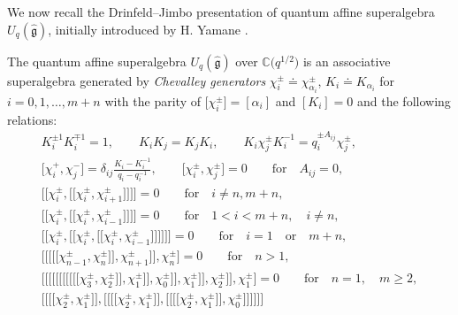 \documentclass[pdftex]{sigma}
\numberwithin{equation}{section}
\begin{document}
We now recall the Drinfeld--Jimbo presentation of quantum affine superalgebra
$U_q(\mathfrak{\hat{g}})$, initially introduced by H. Yamane \cite{HYAM}.
\begin{Definition}
The quantum affine superalgebra $U_q(\mathfrak{\hat{g}})$ over $\mathbb{C}\bigl(q^{1/2}\bigr)$ is an associative superalgebra generated by \emph{Chevalley generators} $\chi_i^{\pm}\doteq\chi_{\alpha_i}^{\pm}$, $K_i\doteq K_{\alpha_i}$ for $i=0,1,\dots,m+n$ with the parity of $\bigl[\chi_i^{\pm}\bigr]=[\alpha_i]$ and $[K_i]=0$ and the following relations:
\begin{gather*}%
 K_i^{\pm 1}K_i^{\mp 1}=1,\qquad K_iK_j=K_jK_i, \qquad
 K_i\chi_j^{\pm}K_i^{-1}=q_i^{\pm A_{ij}}\chi_j^{\pm}, \\
\bigl[\chi_i^+, \chi_j^-\bigr]=\delta_{ij}\frac{K_i-K_i^{-1}}{q_i-q_i^{-1}}, \qquad
\bigl[\chi_i^{\pm}, \chi_j^{\pm}\bigr]=0\qquad \textrm{for}\quad A_{ij}=0,\\
 \bigl[\!\!\bigl[\chi_i^{\pm},\bigl[\!\!\bigl[\chi_i^{\pm}, \chi_{i+1}^{\pm}\bigr]\!\!\bigr] \bigr]\!\!\bigr]=0\qquad\textrm{for}\quad i\neq n,m+n,
\\
 \bigl[\!\!\bigl[\chi_i^{\pm},\bigl[\!\!\bigl[\chi_i^{\pm}, \chi_{i-1}^{\pm}\bigr]\!\!\bigr] \bigr]\!\!\bigr]=0\qquad\textrm{for}\quad 1<i<m+n,\quad i\neq n,
\\
 \bigl[\!\!\bigl[\chi_i^{\pm}, \bigl[\!\!\bigl[\chi_i^{\pm},\bigl[\!\!\bigl[\chi_i^{\pm}, \chi_{i-1}^{\pm}\bigr]\!\!\bigr] \bigr]\!\!\bigr] \bigr]\!\!\bigr]=0\qquad\textrm{for}\quad i=1\quad\textrm{or}\quad m+n, \\
 \bigl[ \bigl[\!\!\bigl[ \bigl[\!\!\bigl[\chi_{n-1}^{\pm}, \chi_n^{\pm}\bigr]\!\!\bigr], \chi_{n+1}^{\pm}\bigr]\!\!\bigr], \chi_n^{\pm}\bigr]=0\qquad\textrm{for}\quad n>1, \\
 \bigl[ \bigl[\!\!\bigl[ \bigl[\!\!\bigl[ \bigl[\!\!\bigl[ \bigl[\!\!\bigl[ \bigl[\!\!\bigl[\chi_3^{\pm}, \chi_2^{\pm}\bigr]\!\!\bigr], \chi_1^{\pm}\bigr]\!\!\bigr], \chi_0^{\pm}\bigr]\!\!\bigr], \chi_1^{\pm}\bigr]\!\!\bigr], \chi_2^{\pm}\bigr]\!\!\bigr], \chi_1^{\pm}\bigr]=0
\qquad\textrm{for} \quad n=1,\quad m\geq 2,\\
 \bigl[\!\!\bigl[ \bigl[\!\!\bigl[\chi_2^{\pm}, \chi_1^{\pm}\bigr]\!\!\bigr], \bigl[\!\!\bigl[ \bigl[\!\!\bigl[\chi_2^{\pm}, \chi_1^{\pm}\bigr]\!\!\bigr], \bigl[\!\!\bigl[ \bigl[\!\!\bigl[\chi_2^{\pm}, \chi_1^{\pm}\bigr]\!\!\bigr], \chi_0^{\pm}\bigr]\!\!\bigr] \bigr]\!\!\bigr] \bigr]\!\!\bigr] \\

\end{gather*}
\end{Definition}
\end{document}
